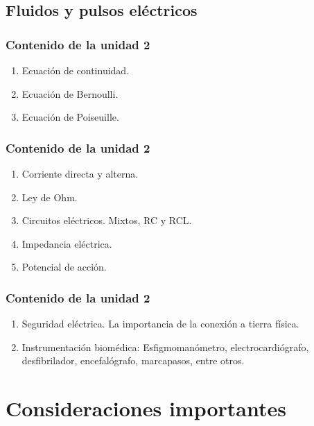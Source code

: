 \documentclass[14pt]{beamer}
\begin{document}
\subsection{Fluidos y pulsos eléctricos}
\begin{frame}
\frametitle{Contenido de la unidad 2}
\begin{enumerate}[<+->]
\item Ecuación de continuidad.
\item Ecuación de Bernoulli.
\item Ecuación de Poiseuille.
\seti
\end{enumerate}
\end{frame}
\begin{frame}
\frametitle{Contenido de la unidad 2}
\begin{enumerate}[<+->]
\item Corriente directa y alterna.
\item Ley de Ohm.
\item Circuitos eléctricos. Mixtos, RC y RCL.
\item Impedancia eléctrica.
\item Potencial de acción.
\seti
\end{enumerate}
\end{frame}
\begin{frame}
\frametitle{Contenido de la unidad 2}
\begin{enumerate}[<+->]
\item Seguridad eléctrica. La importancia de la conexión a tierra física.
\item Instrumentación biomédica: Esfigmomanómetro, electrocardiógrafo, desfibrilador, encefalógrafo, marcapasos, entre otros.
\end{enumerate}
\end{frame}

\section{Consideraciones importantes}
\end{document}
